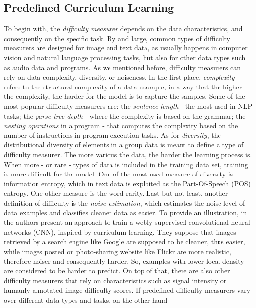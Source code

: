 \subsection{Predefined Curriculum Learning}
To begin with, the \textit{difficulty measurer} depends on the data characteristics, and consequently
on the specific task. 
By and large, common types of difficulty measurers are designed for image and text data, as usually happens in computer vision and natural language processing tasks, 
but also for other data types such as audio data and programs. 
As we mentioned before, difficulty measurers can rely on data complexity, diversity, or noiseness.
In the first place, \textit{complexity} refers to the structural complexity of a data example, in a way that the higher the complexity, 
the harder for the model is to capture the samples. 
Some of the most popular difficulty measurers are: the \textit{sentence length} - the most used in NLP tasks;
the \textit{parse tree depth} - where the complexity is based on the grammar; the \textit{nesting operations} in a program - that computes the complexity based on the number of instructions in
program execution tasks. 
As for \textit{diversity}, the distributional diversity of elements in a group data is meant to define a type of difficulty measurer.
The more various the data, the harder the learning process is.
When more - or rare - types of data is included in the training data set, training is more difficult for the model. 
One of the most used measure of diversity is information entropy, which in text data is exploited as the Part-Of-Speech (POS) entropy. One other measure is the word rarity.
Last but not least, another definition of difficulty is the \textit{noise extimation}, which estimates
the noise level of data examples and classifies cleaner data as easier. To provide an illustration, in \cite{chen2015webly}
the authors present an approach to train a webly supervised convolutional neural networks (CNN), inspired by curriculum learning.
They suppose that images retrieved by a search engine like Google are supposed to be cleaner, thus easier, while images
posted on photo-sharing website like Flickr are more realistic, therefore noiser and consequently harder. 
So, examples with lower local density are considered to be harder to predict. 
On top of that, there are also other difficulty measurers that rely on 
characteristics such as signal intensity or humanly-annotated image difficulty scores.
\newline
If predefined difficulty measurers vary over different data types and tasks, on the other hand
